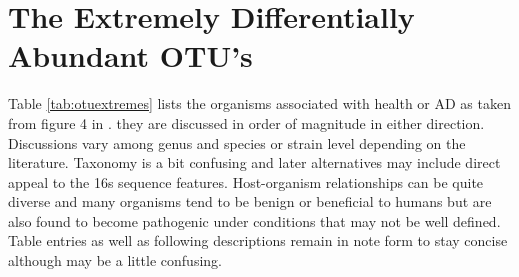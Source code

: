 \documentclass[aps,secnumarabic,balancelastpage,amsmath,amssymb,nofootinbib]{revtex4}
\newcommand{\mjmreftab}[1]{Table  \ref{tab:#1}}
\begin{document}
\begin{comment}



A nutritional or dietary component to Alzheimer's 
has been considered with and without microbial involvement.
 and age dependence due
to impairment of GI tract. In this case eradication of the
offending metabolic routes may be therapeutic but ultimately
the presumed vitamin deficiency still needs to be corrected
to try to repair the GI tract if possible.  






ir utility
for measuring properties of the CNS  environment such as nutritional
status with only incidental contributions to disease progression.
The work suggests the evidence largely supports an infectious
etiology but I try to show here that in fact the microbes
may be making an excellent relevant measurement of nutrient
status in the brain. Some of the properties of the differentially
abundant organisms however do suggest way in which they may
assist or impair brain function by their presence.  
The authors produced a minimally processed list of OTU's that
differed in some ways between disease and control samples
and they tabulated the most extreme differences in the text
which is reproduced below, \mjmreftab{otuextremes}.

\end{comment}

\section{The Extremely Differentially Abundant OTU's  }

\mjmreftab{otuextremes} lists
the organisms 
associated with health or AD as  taken from figure 4 in
 \cite{10.3389/fcimb.2023.1123228} . 
they  are discussed in  order  of magnitude in either direction.  
Discussions vary among genus and species or strain level 
depending on the literature.  Taxonomy is a bit
confusing and later alternatives may include 
direct appeal to the 16s sequence features.
Host-organism relationships can be quite diverse 
and many organisms tend to be benign or beneficial to humans
but are also found to become pathogenic under conditions
that may not be well defined.  Table entries as well as
following descriptions remain in note form to stay
concise although may be a little confusing. 
\end{document}
